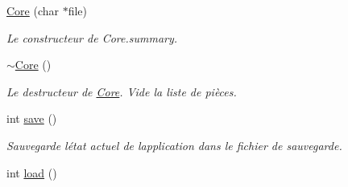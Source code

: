 \begin{DoxyCompactItemize}
\item 
\hyperlink{class_e_p_1_1_core_acfb517a0b01ff278283e940b184fcea4}{Core} (char $\ast$file)
\begin{DoxyCompactList}\small\item\em Le constructeur de Core.\+summary. \end{DoxyCompactList}\item 
\hyperlink{class_e_p_1_1_core_a8e93bf6b84175f17fdbbce75f052a60a}{$\sim$\+Core} ()\hypertarget{class_e_p_1_1_core_a8e93bf6b84175f17fdbbce75f052a60a}{}\label{class_e_p_1_1_core_a8e93bf6b84175f17fdbbce75f052a60a}

\begin{DoxyCompactList}\small\item\em Le destructeur de \hyperlink{class_e_p_1_1_core}{Core}. Vide la liste de pièces. \end{DoxyCompactList}\item 
int \hyperlink{class_e_p_1_1_core_ab89918ae9811065fb1d7d6ff4521ed29}{save} ()\hypertarget{class_e_p_1_1_core_ab89918ae9811065fb1d7d6ff4521ed29}{}\label{class_e_p_1_1_core_ab89918ae9811065fb1d7d6ff4521ed29}

\begin{DoxyCompactList}\small\item\em Sauvegarde l\textquotesingle{}état actuel de l\textquotesingle{}application dans le fichier de sauvegarde. \end{DoxyCompactList}\item 
int \hyperlink{class_e_p_1_1_core_ad7adeeffabb5c616d24a66bb10955149}{load} ()\hypertarget{class_e_p_1_1_core_ad7adeeffabb5c616d24a66bb10955149}{}\label{class_e_p_1_1_core_ad7adeeffabb5c616d24a66bb10955149}


\end{DoxyCompactItemize}
